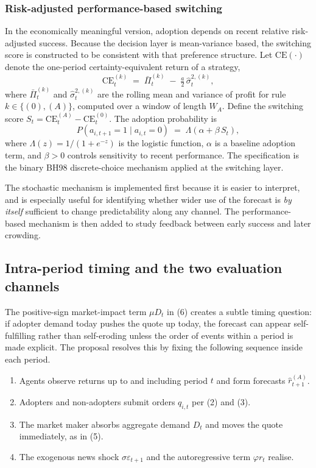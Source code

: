 \documentclass[11pt]{article}
\begin{document}
\subsubsection{Risk-adjusted performance-based switching}

In the economically meaningful version, adoption depends on recent relative risk-adjusted success. Because the decision layer is mean-variance based, the switching score is constructed to be consistent with that preference structure. Let $\mathrm{CE}(\cdot)$ denote the one-period certainty-equivalent return of a strategy,
\begin{equation}
  \mathrm{CE}_t^{(k)} \;=\; \bar{\Pi}_t^{(k)} \;-\; \tfrac{a}{2}\, \hat{\sigma}_{t}^{2,(k)},
\end{equation}
where $\bar{\Pi}_t^{(k)}$ and $\hat{\sigma}_{t}^{2,(k)}$ are the rolling mean and variance of profit for rule $k \in \{(0), (A)\}$, computed over a window of length $W_A$. Define the switching score $S_t = \mathrm{CE}_t^{(A)} - \mathrm{CE}_t^{(0)}$. The adoption probability is
\begin{equation}
  P(a_{i,t+1} = 1 \mid a_{i,t} = 0) \;=\; \Lambda(\alpha + \beta\, S_t),
\end{equation}
where $\Lambda(z) = 1 / (1 + e^{-z})$ is the logistic function, $\alpha$ is a baseline adoption term, and $\beta > 0$ controls sensitivity to recent performance. The specification is the binary BH98 discrete-choice mechanism applied at the switching layer.

The stochastic mechanism is implemented first because it is easier to interpret, and is especially useful for identifying whether wider use of the forecast is \emph{by itself} sufficient to change predictability along any channel. The performance-based mechanism is then added to study feedback between early success and later crowding.


\subsection{Intra-period timing and the two evaluation channels}

The positive-sign market-impact term $\mu D_t$ in (6) creates a subtle timing question: if adopter demand today pushes the quote up today, the forecast can appear self-fulfilling rather than self-eroding unless the order of events within a period is made explicit. The proposal resolves this by fixing the following sequence inside each period.

\begin{enumerate}[label=\arabic*., leftmargin=2em, itemsep=0.2em]
  \item Agents observe returns up to and including period $t$ and form forecasts $\hat{r}_{t+1}^{(A)}$.
  \item Adopters and non-adopters submit orders $q_{i,t}$ per (2) and (3).
  \item The market maker absorbs aggregate demand $D_t$ and moves the quote immediately, as in (5).
  \item The exogenous news shock $\sigma \varepsilon_{t+1}$ and the autoregressive term $\varphi r_t$ realise.
\end{enumerate}
\end{document}

